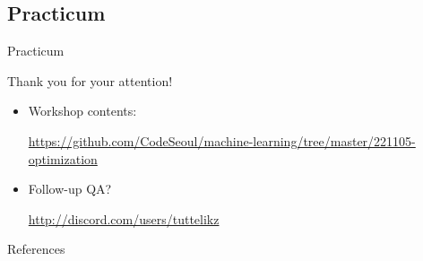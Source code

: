 \documentclass{beamer}
\begin{document}
    \subsection{Practicum}
    \begin{frame}{Practicum}
      \begin{center}
      \begin{huge}Thank you for your attention!\end{huge}
      \end{center}

        \vspace{0.5cm}
        \begin{itemize}
          \item Workshop contents: \\
            \begin{small}\url{https://github.com/CodeSeoul/machine-learning/tree/master/221105-optimization}
            \end{small}
          \item Follow-up QA? \\ 
            \begin{small}\url{http://discord.com/users/tuttelikz}
            \end{small}
        \end{itemize}

    \end{frame}

    \begin{frame}{References}
      \printbibliography  
    \end{frame}
\end{document}
